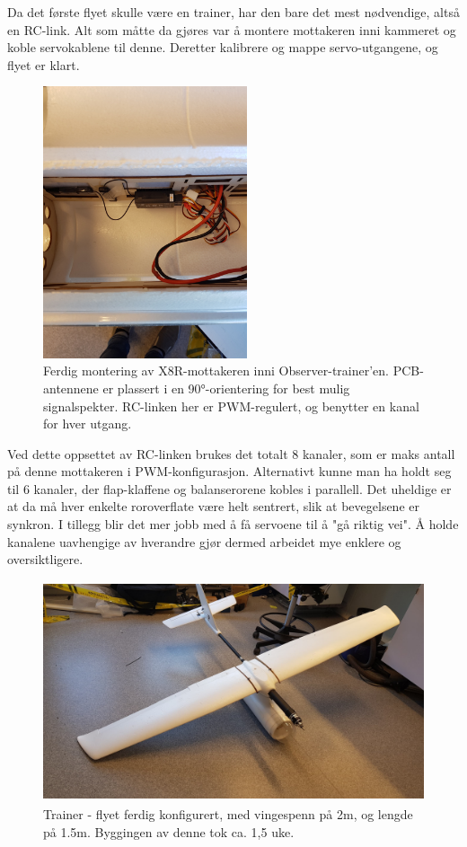 \documentclass[12pt, a4paper]{report}
\begin{document}
Da det første flyet skulle være en trainer, har den bare det mest nødvendige, altså en RC-link. Alt som måtte da gjøres var å montere mottakeren inni kammeret og koble servokablene til denne. Deretter kalibrere og mappe servo-utgangene, og flyet er klart.

\begin{figure}[ht]
	\centering
	\includegraphics[height=8cm, width = .6\textwidth]{bilder/mottakermontering.jpg}
	\caption{Ferdig montering av X8R-mottakeren inni Observer-trainer'en. PCB-antennene er plassert i en \ang{90}-orientering for best mulig signalspekter. RC-linken her er PWM-regulert, og benytter en kanal for hver utgang.}
\end{figure}
\newpage

Ved dette oppsettet av RC-linken brukes det totalt 8 kanaler, som er maks antall på denne mottakeren i PWM-konfigurasjon. Alternativt kunne man ha holdt seg til 6 kanaler, der flap-klaffene og balanserorene kobles i parallell. Det uheldige er at da må hver enkelte roroverflate være helt sentrert, slik at bevegelsene er synkron. I tillegg blir det mer jobb med å få servoene til å "gå riktig vei". Å holde kanalene uavhengige av hverandre gjør dermed arbeidet mye enklere og oversiktligere. 

\begin{figure}[ht]
	\centering
	\includegraphics[width=.6\textwidth, height = 6.5cm]{bilder/forste_fly_ferdigstilt.jpg}
	\caption{Trainer - flyet ferdig konfigurert, med vingespenn på 2m, og lengde på 1.5m. Byggingen av denne tok ca. 1,5 uke. }
\end{figure}
\end{document}
